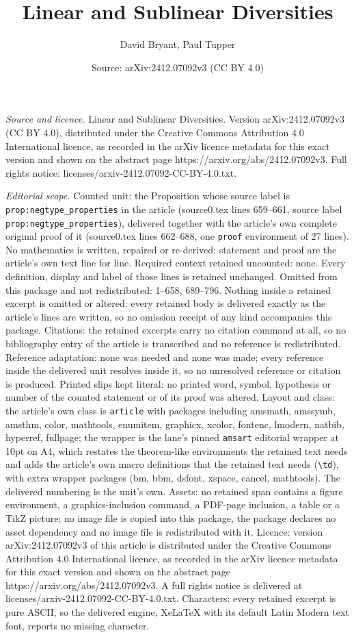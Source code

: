 \documentclass[10pt,a4paper]{amsart}
\title[Linear and Sublinear Diversities]{Linear and Sublinear Diversities}
\author{David Bryant, Paul Tupper}
\date{Source: arXiv:2412.07092v3 (CC BY 4.0)}
\begin{document}
\maketitle

\noindent\emph{Source and licence.} Linear and Sublinear Diversities. Version arXiv:2412.07092v3 (CC BY 4.0), distributed under the Creative Commons Attribution 4.0 International licence, as recorded in the arXiv licence metadata for this exact version and shown on the abstract page https://arxiv.org/abs/2412.07092v3. Full rights notice: licenses/arxiv-2412.07092-CC-BY-4.0.txt.\par\smallskip

\noindent\textit{Editorial scope.} Counted unit: the Proposition whose source label is \texttt{prop:negtype\_properties} in the article (source0.tex lines 659--661, source label \texttt{prop:negtype\_properties}), delivered together with the article's own complete original proof of it (source0.tex lines 662--688, one \texttt{proof} environment of 27 lines). No mathematics is written, repaired or re-derived: statement and proof are the article's own text line for line. Required context retained uncounted: none. Every definition, display and label of those lines is retained unchanged. Omitted from this package and not redistributed: 1--658, 689--796. Nothing inside a retained excerpt is omitted or altered: every retained body is delivered exactly as the article's lines are written, so no omission receipt of any kind accompanies this package. Citations: the retained excerpts carry no citation command at all, so no bibliography entry of the article is transcribed and no reference is redistributed. Reference adaptation: none was needed and none was made; every reference inside the delivered unit resolves inside it, so no unresolved reference or citation is produced. Printed slips kept literal: no printed word, symbol, hypothesis or number of the counted statement or of its proof was altered. Layout and class: the article's own class is \texttt{article} with packages including amsmath, amssymb, amsthm, color, mathtools, enumitem, graphicx, xcolor, fontenc, lmodern, natbib, hyperref, fullpage; the wrapper is the lane's pinned \texttt{amsart} editorial wrapper at 10pt on A4, which restates the theorem-like environments the retained text needs and adds the article's own macro definitions that the retained text needs (\texttt{\textbackslash td}), with extra wrapper packages (bm, bbm, dsfont, xspace, cancel, mathtools). The delivered numbering is the unit's own. Assets: no retained span contains a figure environment, a graphics-inclusion command, a PDF-page inclusion, a table or a TikZ picture; no image file is copied into this package, the package declares no asset dependency and no image file is redistributed with it. Licence: version arXiv:2412.07092v3 of this article is distributed under the Creative Commons Attribution 4.0 International licence, as recorded in the arXiv licence metadata for this exact version and shown on the abstract page https://arxiv.org/abs/2412.07092v3. A full rights notice is delivered at licenses/arxiv-2412.07092-CC-BY-4.0.txt. Characters: every retained excerpt is pure ASCII, so the delivered engine, XeLaTeX with its default Latin Modern text font, reports no missing character.
\end{document}

